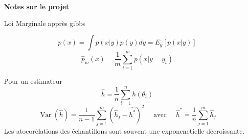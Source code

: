 \documentclass{article}
\begin{document}
{\centering \Large \textbf{Notes sur le projet}} \\

\par{Loi Marginale apprès gibbs \\}

$$
p(x)=\int p(x | y) p(y) d y=E_{y}[p(x | y)]
$$
$$
\widehat{p}_{m}(x)=\frac{1}{m} \sum_{i=1}^{m} p\left(x | y=y_{i}\right)
$$
\par{Pour un estimateur \\}
$$
\widehat{h}=\frac{1}{n} \sum_{i=1}^{n} h\left(\theta_{i}\right)
$$
$$
\operatorname{Var}(\widehat{h})=\frac{1}{n-1} \sum_{j=1}^{m}\left(\widehat{h}_{j}-\widehat{h^{*}}\right)^{2} \quad \text { avec } \quad \widehat{h}^{*}=\frac{1}{n} \sum_{j=1}^{m} \widehat{h}_{j}
$$
Les atocorélations des échantillons sont souvent une exponenetielle décroissante.
\end{document}
